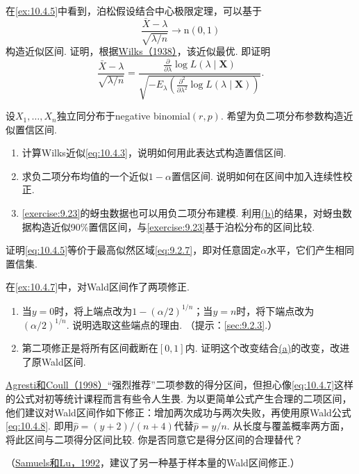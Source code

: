 \begin{exercise}\label{exercise:10.40}
在\autoref{ex:10.4.5}中看到，泊松假设结合中心极限定理，可以基于
$$\frac{\bar X-\lambda}{\sqrt{\lambda/n}}\longrightarrow\mathrm n(0,1)$$
构造近似区间.
证明，根据\hyperref[bib:source330]{Wilks（1938）}，该近似最优. 即证明
$$\frac{\bar X-\lambda}{\sqrt{\lambda/n}}=\frac{\frac\partial{\partial\lambda}\log L(\lambda\mid\boldsymbol X)}{\sqrt{-E_\lambda\left(\frac{\partial^2}{\partial\lambda^2}\log L(\lambda\mid\boldsymbol X)\right)}}.$$
\end{exercise}

\begin{exercise}\label{exercise:10.41}
设$X_1,\ldots,X_n$独立同分布于negative binomial$(r,p)$. 希望为负二项分布参数构造近似置信区间.
\begin{enumerate}[label=(\alph*)]
\item 计算Wilks近似\eqref{eq:10.4.3}，说明如何用此表达式构造置信区间.
\item\label{item:10.41.b} 求负二项分布均值的一个近似$1-\alpha$置信区间. 说明如何在区间中加入连续性校正.
\item \autoref{exercise:9.23}的蚜虫数据也可以用负二项分布建模. 利用\hyperref[item:10.41.b]{(b)}的结果，对蚜虫数据构造近似90\%置信区间，与\autoref{exercise:9.23}基于泊松分布的区间比较.
\end{enumerate}
\end{exercise}

\begin{exercise}\label{exercise:10.42}
证明\eqref{eq:10.4.5}等价于最高似然区域\eqref{eq:9.2.7}，即对任意固定$\alpha$水平，它们产生相同置信集.
\end{exercise}

\begin{exercise}\label{exercise:10.43}
在\autoref{ex:10.4.7}中，对Wald区间作了两项修正.
\begin{enumerate}[label=(\alph*)]
\item\label{item:10.43.a} 当$y=0$时，将上端点改为$1-(\alpha/2)^{1/n}$；当$y=n$时，将下端点改为$(\alpha/2)^{1/n}$. 说明选取这些端点的理由. （提示：\autoref{sec:9.2.3}.）
\item 第二项修正是将所有区间截断在$[0,1]$内. 证明这个改变结合\hyperref[item:10.43.a]{(a)}的改变，改进了原Wald区间.
\end{enumerate}
\end{exercise}

\begin{exercise}\label{exercise:10.44}
\hyperref[bib:source3]{Agresti和Coull（1998）}“强烈推荐”二项参数的得分区间，但担心像\eqref{eq:10.4.7}这样的公式对初等统计课程而言有些令人生畏. 为以更简单公式产生合理的二项区间，他们建议对Wald区间作如下修正：增加两次成功与两次失败，再使用原Wald公式\eqref{eq:10.4.8}. 即用$\hat p=(y+2)/(n+4)$代替$\hat p=y/n$. 从长度与覆盖概率两方面，将此区间与二项得分区间比较. 你是否同意它是得分区间的合理替代？

（\hyperref[bib:source271]{Samuels和Lu，1992}，建议了另一种基于样本量的Wald区间修正.）
\end{exercise}

